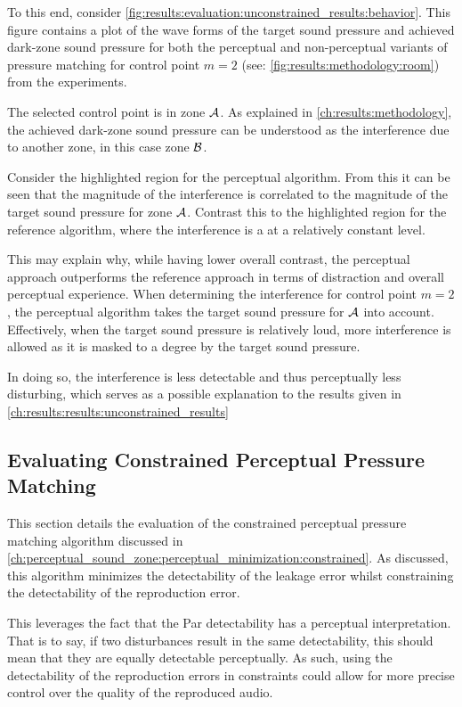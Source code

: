 To this end, consider \autoref{fig:results:evaluation:unconstrained_results:behavior}.
This figure contains a plot of the wave forms of the target sound pressure and achieved dark-zone sound pressure 
for both the perceptual and non-perceptual variants of pressure matching for control point $m=2$ 
(see: \autoref{fig:results:methodology:room}) from the experiments.

The selected control point is in zone $\mathcal{A}$. 
As explained in \autoref{ch:results:methodology}, the achieved dark-zone sound pressure can be understood 
as the interference due to another zone, in this case zone $\mathcal{B}$.

Consider the highlighted region for the perceptual algorithm.
From this it can be seen that the 
magnitude of the interference is correlated to the magnitude of the target sound pressure for zone $\mathcal{A}$.
Contrast this to the highlighted region for the reference algorithm, where the interference is a 
at a relatively constant level.

This may explain why, while having lower overall contrast, the perceptual approach outperforms the 
reference approach in terms of distraction and overall perceptual experience.
When determining the interference for control point $m=2$, the perceptual algorithm takes the 
target sound pressure for $\mathcal{A}$ into account. 
Effectively, when the target sound pressure is relatively loud, more interference is allowed 
as it is masked to a degree by the target sound pressure.

In doing so, the interference is less detectable and thus perceptually less disturbing, 
which serves as a possible explanation to the results given in \autoref{ch:results:results:unconstrained_results}

\subsection{Evaluating Constrained Perceptual Pressure Matching}
\label{ch:results:results:constrained_results}
This section details the evaluation of the constrained perceptual pressure matching algorithm discussed in 
\autoref{ch:perceptual_sound_zone:perceptual_minimization:constrained}.
As discussed, this algorithm minimizes the detectability of the leakage error whilst constraining the detectability of the 
reproduction error.

This leverages the fact that the Par detectability has a perceptual interpretation.
That is to say, if two disturbances result in the same detectability, this should mean that they are equally detectable 
perceptually.
As such, using the detectability of the reproduction errors in constraints could allow for more precise control over the 
quality of the reproduced audio.

